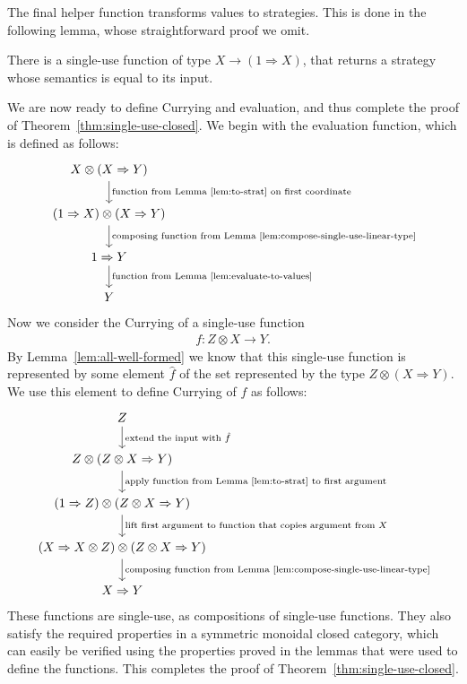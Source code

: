 \documentclass[10pt,a4paper]{amsart}
\numberwithin{equation}{section}
\theoremstyle{plain}
\begin{document}
The final helper function transforms values to strategies. This is done in the following lemma, whose straightforward proof we omit.
\begin{lemma}\label{lem:to-strat}
    There is a single-use function of type $X \to (1 \Rightarrow X)$, 
    that returns a strategy whose semantics is equal to its input.
 \end{lemma}


We are now ready to define Currying and evaluation, and thus  complete the proof of Theorem~\ref{thm:single-use-closed}.  We begin with the evaluation function, which is defined as follows: 
    \[
    \begin{tikzcd}
     X \otimes (X \Rightarrow Y) 
        \ar[d, "{\text{function from Lemma~\ref{lem:to-strat} on first coordinate}}"]
    \\
        (1 \Rightarrow X) \otimes (X \Rightarrow Y)
        \ar[d, "{\text{composing function from Lemma~\ref{lem:compose-single-use-linear-type}}}"]
        \\ 
        1 \Rightarrow Y   
        \ar[d, "{\text{function from Lemma~\ref{lem:evaluate-to-values}}}"]
        \\ 
        Y    
    \end{tikzcd}
    \]
    Now we consider the Currying of  a single-use function
\begin{align*}
f : Z \otimes X \to Y.
\end{align*}
By Lemma~\ref{lem:all-well-formed} we know that this single-use function is represented by some element $\hat f$ of the  set represented by the type $Z \otimes (X \Rightarrow Y)$. We use this element to define Currying of $f$ as follows:
\[
    \begin{tikzcd}
     Z  
        \ar[d, "{\text{extend the input with $\hat f$}}"]
    \\
    Z \otimes (Z \otimes X \Rightarrow Y)
        \ar[d, "{\text{apply function from Lemma~\ref{lem:to-strat} to first argument}}"]
        \\ 
        (1 \Rightarrow Z) \otimes (Z \otimes X \Rightarrow Y)   
        \ar[d, "{\text{lift first argument to function that copies argument from $X$}}"]
        \\ 
        (X \Rightarrow X \otimes Z)  \otimes (Z \otimes X \Rightarrow Y)
        \ar[d, "{\text{composing function from Lemma~\ref{lem:compose-single-use-linear-type}}}"]
        \\ 
        X \Rightarrow Y 
    \end{tikzcd}
    \]
These functions are single-use, as compositions of single-use functions. They also satisfy the required properties in a symmetric monoidal closed category, which can easily be verified using the properties proved in the lemmas that were used to define the functions. This completes the proof of  Theorem~\ref{thm:single-use-closed}.
\end{document}
